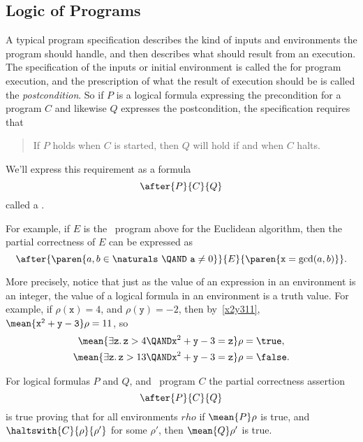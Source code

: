 \begin{problems}
\homeworkproblems
{}
\end{problems}

\subsection{Logic of Programs}

A typical program specification describes the kind of inputs and
environments the program should handle, and then describes what should
result from an execution.  The specification of the inputs or initial
environment is called the  for program execution, and
the prescription of what the result of execution should be is called the
\emph{postcondition}.  So if $P$ is a logical formula expressing the precondition
for a program $C$ and likewise $Q$ expresses the postcondition, the
specification requires that
\begin{quote}
If $P$ holds when $C$ is started, then $Q$ will hold if and when $C$ halts.
\end{quote}
We'll express this requirement as a formula
\[
\after{P}{C}{Q}
\]
called a .

For example, if $E$ is the \while\ program above for the Euclidean
algorithm, then the partial correctness of $E$ can be expressed as
\begin{equation}\label{eucpc}
\after{\paren{a, b \in \naturals\ \QAND\  \mathtt{a} \neq 0}}{E}
                   {\paren{\mathtt{x} = \gcd(a,b)}}.
\end{equation}

More precisely, notice that just as the value of an expression in an
environment is an integer, the value of a logical formula in an
environment is a truth value.  For example, if $\rho(\mathtt{x}) =4$,
and $\rho(\mathtt{y}) =-2$, then by~\eqref{x2y311},
$\mean{\mathtt{x^2+y -3}}\rho = 11$, so
\begin{align*}
\mean{\exists \mathtt{z}.\, \mathtt{z} > 4 \QAND \mathtt{x}^2+\mathtt{y} -3=\mathtt{z}}\rho & = \true,\\
\mean{\exists \mathtt{z}.\, \mathtt{z} > 13 \QAND \mathtt{x}^2+\mathtt{y} -3=\mathtt{z}}\rho & = \false.
\end{align*}

\begin{definition}\label{def_afterPCQ}
For logical formulas $P$ and $Q$, and \while\ program $C$ the partial correctness assertion
\[
\after{P}{C}{Q}
\]
is true proving that for all environments $rho$ if $\mean{P}\rho$ is
true, and $\haltswith{C}{\rho}{\rho'}$ for some $\rho'$, then
$\mean{Q}\rho'$ is true.
\end{definition}

